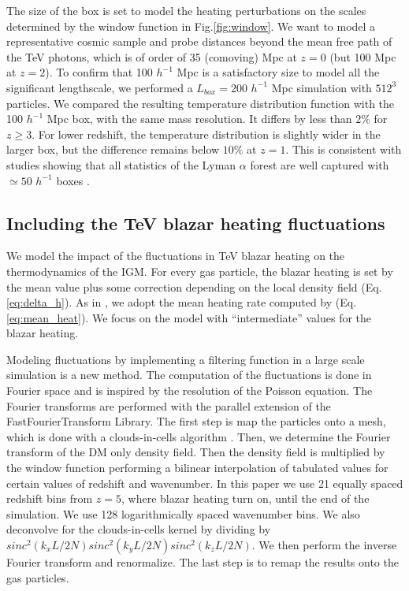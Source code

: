 \documentclass[twocolumns]{emulateapj}
\begin{document}
The size of the box is set to model the heating perturbations on the scales determined by the window function in Fig.\ref{fig:window}. We want to model a representative cosmic sample and probe distances beyond the mean free path of the TeV photons, which is of order of 35 (comoving) Mpc at $z=0$ (but 100 Mpc at $z=2$).  To confirm that 100 $h^{-1}$ Mpc is a satisfactory size to model all the significant lengthscale, we performed a $L_{box}=200 $ $h^{-1}$ Mpc simulation with $512^3$ particles. We compared the resulting temperature distribution function with the 100 $h^{-1}$ Mpc box, with the same mass resolution.  It differs by less than $2\%$ for $z\geqslant 3$. For lower redshift, the temperature distribution is slightly wider in the larger box, but the difference remains below $10\%$ at $z=1$. This is consistent with studies showing that all statistics of the Lyman $\alpha$ forest are well captured with $\simeq 50$ $h^{-1}$ boxes \citep{2007MNRAS.374..196R,2009MNRAS.398L..26B}.



\subsection{Including the TeV blazar heating fluctuations}
We model the impact of the fluctuations in TeV blazar heating on the thermodynamics of the IGM. For every gas particle, the blazar heating is set by the mean value plus some correction depending on the local density field (Eq. \ref{eq:delta_h}). As in \citet{2012MNRAS.423..149P}, we adopt the mean heating rate computed by \citet{2012ApJ...752...23C} (Eq. \ref{eq:mean_heat}). We focus on the model with ``intermediate'' values for the blazar heating.

Modeling fluctuations by implementing a filtering function in a large scale simulation is a new method. The computation of the fluctuations is done in Fourier space and is inspired by the resolution of the Poisson equation. The Fourier transforms are performed with the parallel extension of the FastFourierTransform Library. The first step is map the particles onto a mesh, which is done with a clouds-in-cells algorithm \citep{1981csup.book.....H}. Then, we  determine the Fourier transform of the DM only density field. Then the density field is  multiplied by the window function performing a bilinear interpolation of tabulated values for certain values of redshift and wavenumber. In this paper we use 21 equally spaced redshift bins from $z=5$, where blazar heating turn on, until the end of the simulation. We use 128 logarithmically spaced wavenumber bins. We also deconvolve for the clouds-in-cells kernel by dividing by $sinc^2(k_xL/2N)sinc^2(k_yL/2N)sinc^2(k_zL/2N)$. We then perform the inverse Fourier transform and renormalize. The last step is to remap the results onto the gas particles.
\end{document}

